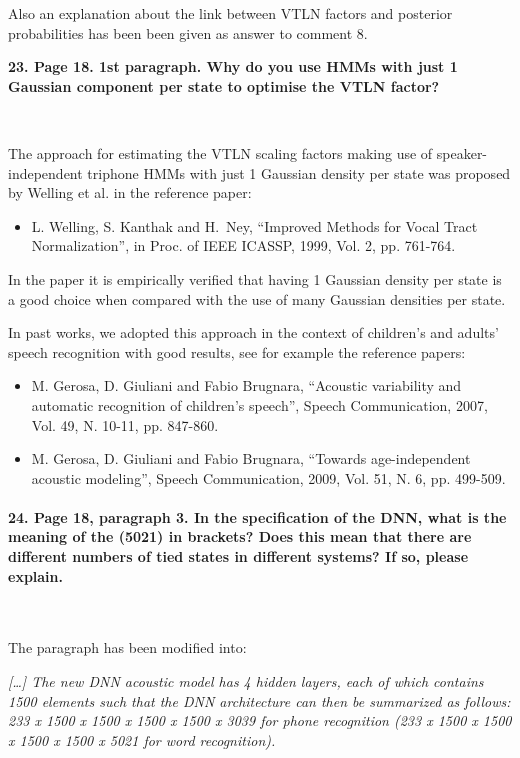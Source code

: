 \documentclass[]{article}
\begin{document}
Also an explanation about the link between VTLN factors and posterior probabilities has been been given as answer to comment 8.

\textbf{23. Page 18. 1st paragraph. Why do you use HMMs with just 1 Gaussian component per state to optimise the VTLN factor? }

~

The   approach  for  estimating   the  VTLN   scaling factors  making   use  of
speaker-independent  triphone  HMMs  with  just 1 Gaussian density  per  state  was
proposed by Welling et al. in the reference paper:
\begin{itemize}
\item L. Welling, S. Kanthak and  H.~Ney, ``Improved Methods for Vocal Tract                                              
Normalization'', in Proc. of IEEE ICASSP, 1999, Vol. 2, pp. 761-764.
\end{itemize}

In the paper it is empirically verified that having 1 Gaussian density
per state is a good  choice when compared
with the use of many Gaussian densities per state.

In past works, we  adopted this approach  in the context  of children's
and adults' speech recognition  with good results,  see for example  the reference
papers:

\begin{itemize}
\item M. Gerosa, D. Giuliani  and Fabio Brugnara, ``Acoustic variability and
automatic recognition of children’s speech'', Speech Communication,
2007, Vol. 49, N. 10-11, pp. 847-860.
\item M. Gerosa, D. Giuliani and Fabio Brugnara, ``Towards age-independent acoustic modeling'',
Speech Communication, 2009, Vol. 51, N. 6, pp. 499-509.
\end{itemize}


\paragraph{24. Page 18, paragraph 3. In the specification of the DNN, what is the meaning of the (5021) in brackets? Does this mean that there are different numbers of tied states in different systems? If so, please explain.}

~

The paragraph has been modified into:

\textit{[\dots] The new DNN acoustic model  has 4 hidden layers,
each of  which contains 1500  elements such that the  DNN architecture
can then be summarized  as follows: 233 x 1500 x 1500  x 1500 x 1500 x
3039 for phone recognition (233 x 1500 x 1500  x 1500 x 1500 x 5021 for word recognition).}
\end{document}
